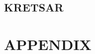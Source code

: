 \documentclass[a4paper,twoside,twocolumn,openright]{book}
\begin{document}
\chapter{KRETSAR}

\cleardoublepage
%
%
%
%
%
%
%
%

%
%
%
%
%
%
%
%
%

%
%
%
%
%
%

%

%
%
%

\appendix
\part{APPENDIX}

%

%
%
%
%
%
%
%
%


\listoffigures
\listoftables

\backmatter

\printindex
\end{document}
